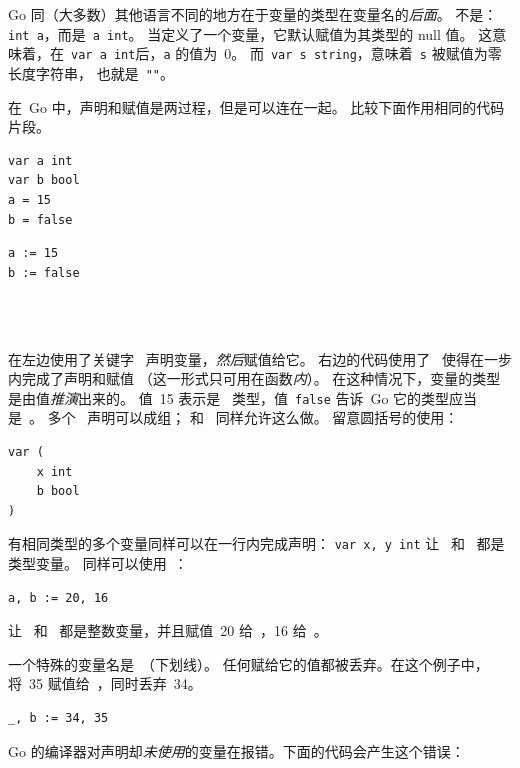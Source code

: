 Go 同（大多数）其他语言不同的地方在于变量的类型在变量名的\emph{后面}。
不是：\lstinline{int a}，而是~\lstinline{a int}。
当定义了一个变量，它默认赋值为其类型的 null 值。
这意味着，在~\lstinline{var a int}后，\lstinline{a} 的值为~0。
而~\lstinline{var s string}，意味着~\lstinline{s} 被赋值为零长度字符串，
也就是~\lstinline{""}。

在~Go 中，声明和赋值是两过程，但是可以连在一起。
比较下面作用相同的代码片段。

\begin{minipage}{.5\textwidth}
\begin{lstlisting}[linewidth=.5\textwidth,caption={用 = 声明}]
var a int
var b bool
a = 15
b = false
\end{lstlisting}
\hfill
\end{minipage}
\begin{minipage}{.5\textwidth}
\begin{lstlisting}[linewidth=.5\textwidth,caption={用 := 声明}]
a := 15
b := false
\end{lstlisting}
\ \\
\ \\
\hfill
\end{minipage}

在左边使用了关键字~ 声明变量，\emph{然后}赋值给它。
右边的代码使用了~\mbox{\key{:=}{ }} 使得在一步内完成了声明和赋值
（这一形式只可用在函数\emph{内}）。
在这种情况下，变量的类型是由值\emph{推演}出来的。
值~15 表示是~ 类型，值~\texttt{false} 告诉~Go 它的类型应当是~。
多个~ 声明可以成组； 和~ 同样允许这么做。
留意圆括号的使用：
\begin{lstlisting}
var (
    x int
    b bool
)
\end{lstlisting}
有相同类型的多个变量同样可以在一行内完成声明：
\lstinline{var x, y int} 让~ 和~ 都是~ 类型变量。
同样可以使用~：
\begin{lstlisting}
a, b := 20, 16
\end{lstlisting}
让~ 和~ 都是整数变量，并且赋值~20 给~，16 给~。

一个特殊的变量名是~\var{\textbf{\_}}（下划线）。
任何赋给它的值都被丢弃。在这个例子中，将~35 赋值给~，同时丢弃~34。
\begin{lstlisting}
_, b := 34, 35
\end{lstlisting}
Go 的编译器对声明却\emph{未使用}的变量在报错。下面的代码会产生这个错误：

